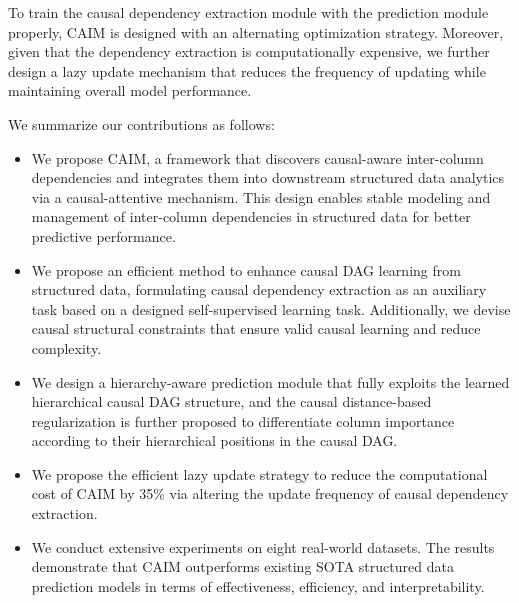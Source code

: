 \documentclass[sigconf, nonacm]{acmart}
\newcommand{\zj}[1]{{\color{black}#1}}
\newcommand{\done}[1]{{\color{black}#1}}
\newcommand{\que}[1]{{\color{black}#1}}
\newcommand{\rl}[1]{{\color{black}#1}}
\newcommand{\sy}[1]{{\color{black}#1}}
\newcommand{\rln}[1]{{\color{black}#1}}
\newcommand{\sydesi}[1]{{\color{black}#1}}
\newcommand{\syadd}[1]{{\color{black}#1}}
\newcommand{\vldb}[1]{{\color{red}#1}}
\newcommand*{\ourmodel}{CAIM}
\begin{document}
\rl{To train the causal dependency extraction module with the prediction module properly, \ourmodel{} \rln{is designed with} an alternating optimization strategy. }
\rl{
Moreover, given that the dependency extraction is computationally expensive, we further design a lazy update mechanism that reduces the frequency of updating while maintaining overall model performance.
}

We summarize our contributions as follows:

\begin{itemize}
    \item\que{
    

    \vldb{We propose \ourmodel{}, a framework that discovers causal-aware \done{inter-column} dependencies and integrates them into downstream structured data analytics via a causal-attentive mechanism.
    This design enables stable modeling and management of inter-column dependencies in structured data for better predictive performance.
    }
    }
    
    \item\que{ 
    We propose an efficient method to enhance causal \sy{DAG learning} from structured data, formulating \sy{causal dependency extraction as an auxiliary task based on a designed self-supervised learning task. }
    Additionally, we \sy{devise causal structural constraints}
    \zj{that ensure valid causal learning and reduce complexity.}}

    \item We design a \sy{hierarchy-aware prediction module} that fully exploits the learned hierarchical causal DAG structure,
    \sy{and the causal distance-based regularization is further proposed to differentiate column importance according to their hierarchical positions in the causal DAG.}

    \item We propose the efficient lazy update strategy to reduce the computational \sy{cost of \ourmodel{} \syadd{by 35\%} via altering the update frequency of causal dependency extraction.}
    
    \item We conduct extensive experiments on \sy{eight} real-world datasets. The results demonstrate that \ourmodel{} outperforms existing SOTA structured data prediction models in terms of \sy{effectiveness, efficiency, and interpretability}.
\end{itemize}
\end{document}
